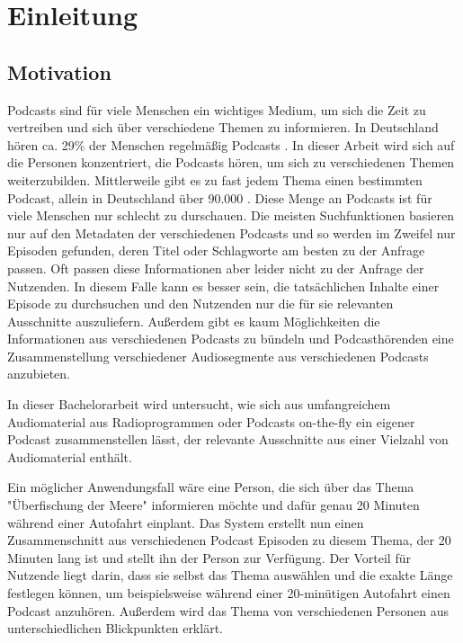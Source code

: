 \chapter{Einleitung}\label{ch:intro}

\section{Motivation}

Podcasts sind für viele Menschen ein wichtiges Medium, um sich die Zeit zu vertreiben und sich über verschiedene Themen zu informieren. 
In Deutschland hören ca. 29\% der Menschen regelmäßig Podcasts \cite{newman2022}.
In dieser Arbeit wird sich auf die Personen konzentriert, die Podcasts hören, um sich zu verschiedenen Themen weiterzubilden.
Mittlerweile gibt es zu fast jedem Thema einen bestimmten Podcast, allein in Deutschland über 90.000 \cite{listennotes}.
Diese Menge an Podcasts ist für viele Menschen nur schlecht zu durschauen.
Die meisten Suchfunktionen basieren nur auf den Metadaten der verschiedenen Podcasts und so werden im Zweifel nur Episoden gefunden, deren Titel oder Schlagworte am besten zu der Anfrage passen.
Oft passen diese Informationen aber leider nicht zu der Anfrage der Nutzenden.
In diesem Falle kann es besser sein, die tatsächlichen Inhalte einer Episode zu durchsuchen und den Nutzenden nur die für sie relevanten Ausschnitte auszuliefern.
Außerdem gibt es kaum Möglichkeiten die Informationen aus verschiedenen Podcasts zu bündeln und Podcasthörenden eine Zusammenstellung verschiedener Audiosegmente aus verschiedenen Podcasts anzubieten.

In dieser Bachelorarbeit wird untersucht, wie sich aus umfangreichem Audiomaterial aus Radioprogrammen oder Podcasts on-the-fly ein eigener Podcast zusammenstellen lässt, der relevante Ausschnitte aus einer Vielzahl von Audiomaterial enthält.

Ein möglicher Anwendungsfall wäre eine Person, die sich über das Thema "Überfischung der Meere" informieren möchte und dafür genau 20 Minuten während einer Autofahrt einplant. 
Das System erstellt nun einen Zusammenschnitt aus verschiedenen Podcast Episoden zu diesem Thema, der 20 Minuten lang ist und stellt ihn der Person zur Verfügung. 
Der Vorteil für Nutzende liegt darin, dass sie selbst das Thema auswählen und die exakte Länge festlegen können, um beispielsweise während einer 20-minütigen Autofahrt einen Podcast anzuhören. 
Außerdem wird das Thema von verschiedenen Personen aus unterschiedlichen Blickpunkten erklärt. 


